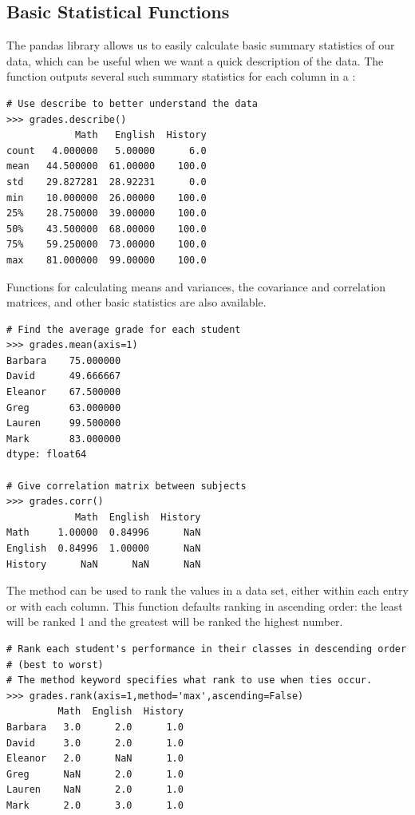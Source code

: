 \subsection*{Basic Statistical Functions}

The pandas library allows us to easily calculate basic summary statistics of our data,
which can be useful when we want a quick description of the data.
The  function
outputs several such summary statistics for each column in a :
\begin{lstlisting}
# Use describe to better understand the data
>>> grades.describe()
            Math   English  History
count   4.000000   5.00000      6.0
mean   44.500000  61.00000    100.0
std    29.827281  28.92231      0.0
min    10.000000  26.00000    100.0
25%    28.750000  39.00000    100.0
50%    43.500000  68.00000    100.0
75%    59.250000  73.00000    100.0
max    81.000000  99.00000    100.0
\end{lstlisting}

Functions for calculating means and variances, the covariance and correlation matrices, and other
basic statistics are also available.

\begin{lstlisting}
# Find the average grade for each student
>>> grades.mean(axis=1)
Barbara    75.000000
David      49.666667
Eleanor    67.500000
Greg       63.000000
Lauren     99.500000
Mark       83.000000
dtype: float64

# Give correlation matrix between subjects
>>> grades.corr()
            Math  English  History
Math     1.00000  0.84996      NaN
English  0.84996  1.00000      NaN
History      NaN      NaN      NaN
\end{lstlisting}

The method  can be used to rank the values in a data set, either within each entry or with each column.
This function defaults ranking in ascending order: the least will be ranked 1 and the greatest will be ranked the highest number.

\begin{lstlisting}
# Rank each student's performance in their classes in descending order
# (best to worst)
# The method keyword specifies what rank to use when ties occur.
>>> grades.rank(axis=1,method='max',ascending=False)
         Math  English  History
Barbara   3.0      2.0      1.0
David     3.0      2.0      1.0
Eleanor   2.0      NaN      1.0
Greg      NaN      2.0      1.0
Lauren    NaN      2.0      1.0
Mark      2.0      3.0      1.0
\end{lstlisting}

